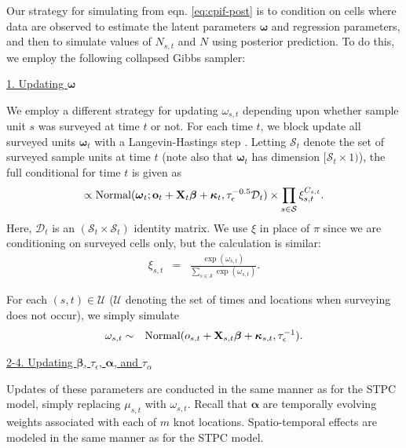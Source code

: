 \documentclass[12pt,fleqn]{article}
\begin{document}
\begin{flushleft}
Our strategy for simulating from eqn. \ref{eq:cpif-post} is to condition on cells where data are observed to estimate the latent parameters $\boldsymbol{\omega}$ and regression parameters, and then to simulate values of $N_{s,t}$ and $N$ using posterior prediction.   To do this, we employ the following collapsed Gibbs sampler:

\underline{1. Updating $\boldsymbol{\omega}$}

We employ a different strategy for updating $\omega_{s,t}$ depending upon whether sample unit $s$ was surveyed at time $t$ or not.  For each time $t$, we block update all surveyed units $\boldsymbol{\omega}_{t}$ with a Langevin-Hastings step \citep[see e.g.,][section 7.1.4]{GivensHoeting2005}.  Letting $\mathcal{S}_t$ denote the set of surveyed sample units at time $t$ (note also that $\boldsymbol{\omega}_t$ has dimension $[\mathcal{S}_t \times 1)$), the full conditional for time $t$ is given as
\begin{equation*}
  [\boldsymbol{\omega}_{t} | \cdot] \propto \textrm{Normal}(\boldsymbol{\omega}_t;{\bf o}_t + {\bf X}_{t} \boldsymbol{\beta} + \boldsymbol{\kappa}_{t}, \tau_\epsilon^{-0.5} \mathcal{D}_t) \times \prod_{s \in \mathcal{S}} \xi_{s,t}^{C_{s,t}}.
\end{equation*}
Here, $\mathcal{D}_t$ is an $(\mathcal{S}_t \times \mathcal{S}_t)$ identity matrix.  We use $\xi$ in place of $\pi$ since we are conditioning on surveyed cells only, but the calculation is similar:
\begin{eqnarray*}
  \xi_{s,t} & = & \frac{ \exp(\omega_{s,t})}{\sum_{s \in \mathcal{S}} \exp(\omega_{s,t})}.
\end{eqnarray*}


\hspace{.5in} For each $(s,t) \in \mathcal{U}$ ($\mathcal{U}$ denoting the set of times and locations when surveying does not occur), we simply simulate
\begin{eqnarray*}
  \omega_{s,t} & \sim & \textrm{Normal}(o_{s,t} + {\bf X}_{s,t} \boldsymbol{\beta} + \boldsymbol{\kappa}_{s,t}, \tau_\epsilon^{-1}).
\end{eqnarray*}


\underline{2-4. Updating $\boldsymbol{\beta}$, $\tau_\epsilon$, $\boldsymbol{\alpha}$, and $\tau_\alpha$}

Updates of these parameters are conducted in the same manner as for the STPC model, simply replacing
$\mu_{s,t}$ with $\omega_{s,t}$.  Recall that $\boldsymbol{\alpha}$ are temporally evolving weights associated
with each of $m$ knot locations.  Spatio-temporal effects are modeled in the same manner as for the STPC model.


\end{flushleft}
\end{document}
